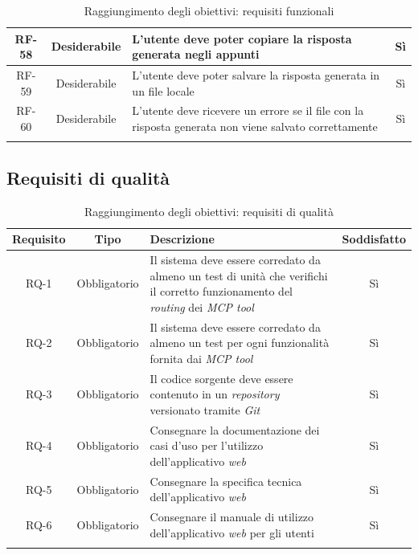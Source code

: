 \begin{center}
\begin{xltabular}{\textwidth}{|c|c| >{\arraybackslash}X|c|}
        \hline
        RF-58 & Desiderabile & L'utente deve poter copiare la risposta generata negli appunti & Sì \\
        \hline
        RF-59 & Desiderabile & L'utente deve poter salvare la risposta generata in un file locale & Sì \\
        \hline
        RF-60 & Desiderabile & L'utente deve ricevere un errore se il file con la risposta generata non viene salvato correttamente & Sì \\
        \hline
        \caption{Raggiungimento degli obiettivi: requisiti funzionali}
        \label{tab:raggiungimento-funzionali}
    \end{xltabular}
\end{center}
\endgroup

\subsection{Requisiti di qualità}
\begingroup
\renewcommand{\arraystretch}{1.50}
\begin{center}
    \begin{xltabular}{\textwidth}{|c|c| >{\arraybackslash}X|c|}
        \hline
        \textbf{Requisito} & \textbf{Tipo} & \textbf{Descrizione} & \textbf{Soddisfatto} \\
        \hline
        \endhead
        RQ-1 & Obbligatorio & Il sistema deve essere corredato da almeno un test di unità che verifichi il corretto funzionamento del \textit{routing} dei \textit{MCP tool} & Sì \\
        \hline
        RQ-2 & Obbligatorio & Il sistema deve essere corredato da almeno un test per ogni funzionalità fornita dai \textit{MCP tool} & Sì \\
        \hline
        RQ-3 & Obbligatorio & Il codice sorgente deve essere contenuto in un \textit{repository} versionato tramite \textit{Git} & Sì \\
        \hline
        RQ-4 & Obbligatorio & Consegnare la documentazione dei casi d'uso per l'utilizzo dell'applicativo \textit{web} & Sì \\
        \hline
        RQ-5 & Obbligatorio & Consegnare la specifica tecnica dell'applicativo \textit{web} & Sì \\
        \hline
        RQ-6 & Obbligatorio & Consegnare il manuale di utilizzo dell'applicativo \textit{web} per gli utenti & Sì \\
        \hline
        \caption{Raggiungimento degli obiettivi: requisiti di qualità}
        \label{tab:raggiungimento-qualita}
    \end{xltabular}
\end{center}
\endgroup

